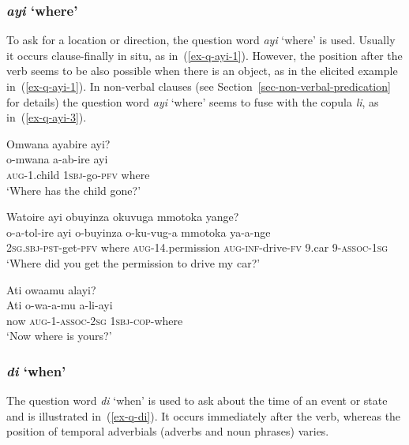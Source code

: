 \subsubsection{\emph{ayi} `where'} 

To ask for a location or direction, the question word \emph{ayi} ‘where’ is used. 
Usually it occurs clause-finally in situ, as in~(\ref{ex-q-ayi-1}).
However, the position after the verb seems to be also possible when there is an object, as in the elicited example in~(\ref{ex-q-ayi-1}).
In non-verbal clauses (see Section~\ref{sec-non-verbal-predication} for details) the question word \emph{ayi} ‘where’ seems to fuse with the copula \emph{li}, as in~(\ref{ex-q-ayi-3}).

\ea \label{ex-q-ayi}
\begin{xlist}
\ex	\label{ex-q-ayi-1}
	\glll Omwana ayabire ayi?\\
	 o-mwana a-ab-ire ayi\\
		\textsc{aug}-1.child \textsc{1sbj}-go-\textsc{pfv} where\\
	\glt `Where has the child gone?’

\ex	\label{ex-q-ayi-2}
	\glll Watoire ayi obuyinza okuvuga mmotoka yange?\\
	 o-a-tol-ire 		ayi 		o-buyinza	o-ku-vug-a mmotoka ya-a-nge\\
	2\textsc{sg.sbj}-\textsc{pst}-get-\textsc{pfv}	where	\textsc{aug}-14.permission \textsc{aug}-\textsc{inf}-drive-\textsc{fv} 9.car 9-\textsc{assoc}-\textsc{1sg}\\
	\glt `Where did you get the permission to drive my car?'
	
\ex	\label{ex-q-ayi-3}
	\glll Ati owaamu alayi?\\
		Ati o-wa-a-mu a-li-ayi\\
		now \textsc{aug}-1-\textsc{assoc}-2\textsc{sg} \textsc{1sbj}-\textsc{cop}-where\\
	\glt	`Now where is yours?'\end{xlist}
\z


\subsubsection{\emph{di} `when'}  

The question word \emph{di} `when' is used to ask about the time of an event or state and is illustrated in~(\ref{ex-q-di}).
It occurs immediately after the verb, whereas the position of temporal adverbials (adverbs and noun phrases) varies.  


